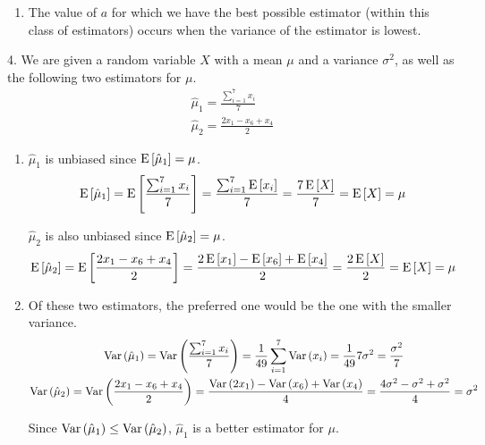 \documentclass[fleqn]{article}
\begin{document}
\begin{answers}
\begin{enumerate}
			\item %
				The value of \(a\) for which we have the best possible estimator (within this class of estimators) occurs when the variance of the estimator is lowest.
		\end{enumerate}

	\item[4.]
		We are given a random variable \(X\) with a mean \(\mu\) and a variance \(\sigma^2\), as well as the following two estimators for \(\mu\).
		\begin{gather*}
			\hat{\mu}_1 = \frac{\sum_{i=1}^7 x_i}{7} \\
			\hat{\mu}_2 = \frac{2x_1 - x_6 + x_4}{2}
		\end{gather*}

		\begin{enumerate}
			\item %
				\(\hat{\mu}_1\) is unbiased since \(\operatorname{E}\left[\hat{\mu}_1\right] = \mu\).
				\[\operatorname{E}\left[\hat{\mu}_1\right] = \operatorname{E}\left[\frac{\sum_{i=1}^7 x_i}{7}\right] = \frac{\sum_{i=1}^7 \operatorname{E}\left[x_i\right]}{7} = \frac{7 \operatorname{E}\left[X\right]}{7} = \operatorname{E}\left[X\right] = \mu\]

				\(\hat{\mu}_2\) is also unbiased since \(\operatorname{E}\left[\hat{\mu}_2\right] = \mu\).
				\[\operatorname{E}\left[\hat{\mu}_2\right] = \operatorname{E}\left[\frac{2x_1 - x_6 + x_4}{2}\right] = \frac{2\operatorname{E}\left[x_1\right] - \operatorname{E}\left[x_6\right] + \operatorname{E}\left[x_4\right]}{2} = \frac{2\operatorname{E}\left[X\right]}{2} = \operatorname{E}\left[X\right] = \mu\]

			\item %
				Of these two estimators, the preferred one would be the one with the smaller variance.
				\begin{gather*}
					\operatorname{Var}\left(\hat{\mu}_1\right) = \operatorname{Var}\left(\frac{\sum_{i=1}^7 x_i}{7}\right) = \frac{1}{49} \sum_{i=1}^7 \operatorname{Var}\left(x_i\right) = \frac{1}{49}7\sigma^2 = \frac{\sigma^2}{7} \\
					\operatorname{Var}\left(\hat{\mu}_2\right) = \operatorname{Var}\left(\frac{2x_1 - x_6 + x_4}{2}\right) = \frac{\operatorname{Var}\left(2x_1\right) - \operatorname{Var}\left(x_6\right) + \operatorname{Var}\left(x_4\right)}{4} = \frac{4\sigma^2 - \sigma^2 + \sigma^2}{4} = \sigma^2
				\end{gather*}

				Since \(\operatorname{Var}\left(\hat{\mu}_1\right) \leq \operatorname{Var}\left(\hat{\mu}_2\right)\), \(\hat{\mu}_1\) is a better estimator for \(\mu\).
		\end{enumerate}
\end{answers}
\end{document}

